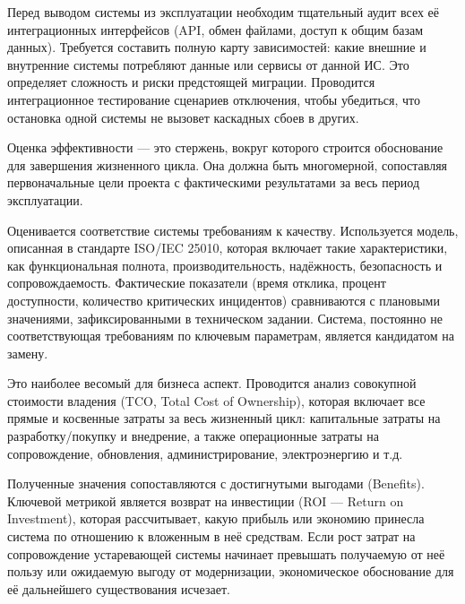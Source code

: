 \documentclass{SibFU-docs}
\begin{document}

Перед выводом системы из эксплуатации необходим тщательный аудит всех её интеграционных интерфейсов (API, обмен файлами, доступ к общим базам данных). Требуется составить полную карту зависимостей: какие внешние и внутренние системы потребляют данные или сервисы от данной ИС. Это определяет сложность и риски предстоящей миграции. Проводится интеграционное тестирование сценариев отключения, чтобы убедиться, что остановка одной системы не вызовет каскадных сбоев в других.


Оценка эффективности — это стержень, вокруг которого строится обоснование для завершения жизненного цикла. Она должна быть многомерной, сопоставляя первоначальные цели проекта с фактическими результатами за весь период эксплуатации.


Оценивается соответствие системы требованиям к качеству. Используется модель, описанная в стандарте ISO/IEC 25010, которая включает такие характеристики, как функциональная полнота, производительность, надёжность, безопасность и сопровождаемость. Фактические показатели (время отклика, процент доступности, количество критических инцидентов) сравниваются с плановыми значениями, зафиксированными в техническом задании. Система, постоянно не соответствующая требованиям по ключевым параметрам, является кандидатом на замену. \cite{ISO25010_2011}


Это наиболее весомый для бизнеса аспект. Проводится анализ совокупной стоимости владения (TCO, Total Cost of Ownership), которая включает все прямые и косвенные затраты за весь жизненный цикл: капитальные затраты на разработку/покупку и внедрение, а также операционные затраты на сопровождение, обновления, администрирование, электроэнергию и т.д.

Полученные значения сопоставляются с достигнутыми выгодами (Benefits). Ключевой метрикой является возврат на инвестиции (ROI — Return on Investment), которая рассчитывает, какую прибыль или экономию принесла система по отношению к вложенным в неё средствам. Если рост затрат на сопровождение устаревающей системы начинает превышать получаемую от неё пользу или ожидаемую выгоду от модернизации, экономическое обоснование для её дальнейшего существования исчезает. \cite{Botchkarev2011, Anisiforov2014}
\end{document}
